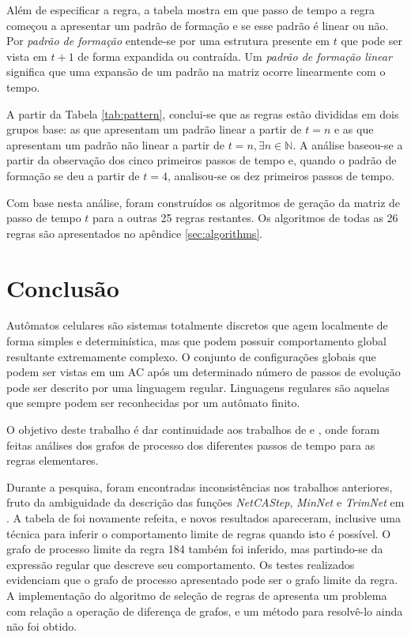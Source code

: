 \documentclass[12pt,a4paper]{article}
\begin{document}
Além de especificar a regra, a tabela mostra em que passo de tempo a regra
começou a apresentar um padrão de formação e se esse padrão é linear
ou não. Por \textit{padrão de formação} entende-se por uma estrutura
presente em $t$ que pode ser vista em $t+1$ de forma expandida ou contraída.
Um \textit{padrão de formação linear} significa que uma
expansão de um padrão na matriz ocorre linearmente com o tempo.

A partir da Tabela \ref{tab:pattern}, conclui-se que as regras estão divididas
em dois grupos base: as que apresentam um padrão linear a partir de $t=n$ e as que
apresentam um padrão não linear a partir de $t=n,\exists n \in \mathbb{N}$.
A análise baseou-se a partir da observação dos cinco primeiros passos de
tempo e, quando o padrão de formação se deu a partir de $t=4$, analisou-se
os dez primeiros passos de tempo.

Com base nesta análise, foram construídos os algoritmos de geração da matriz
de passo de tempo $t$ para a outras 25 regras restantes. Os algoritmos de todas as
26 regras são apresentados no apêndice \ref{sec:algorithms}.

\newpage

\section{Conclusão}\label{sec:conclude}

Autômatos celulares são sistemas totalmente discretos que agem localmente
de forma simples e determinística, mas que podem possuir
comportamento global resultante extremamente complexo. O conjunto de
configurações globais que podem ser vistas em um AC após um determinado
número de passos de evolução pode ser descrito por uma linguagem
regular. Linguagens regulares são aquelas que sempre podem ser reconhecidas
por um autômato finito.

O objetivo deste trabalho é dar continuidade aos trabalhos de
 e , onde foram feitas
análises dos grafos de processo dos diferentes passos de tempo
para as regras elementares.

Durante a pesquisa, foram encontradas inconsistências nos trabalhos anteriores,
fruto da ambiguidade da descrição das funções \emph{NetCAStep}, \emph{MinNet} e \emph{TrimNet}
em . A tabela de  foi novamente
refeita, e novos resultados apareceram, inclusive uma técnica para inferir
o comportamento limite de regras quando isto é possível. O grafo de processo
limite da regra 184 também foi inferido, mas partindo-se da expressão regular
que descreve seu comportamento. Os testes realizados evidenciam que o grafo
de processo apresentado pode ser o grafo limite da regra. A implementação do
algoritmo de seleção de regras de  apresenta um
problema com relação a operação de diferença de grafos, e um método para
resolvê-lo ainda não foi obtido.
\end{document}
